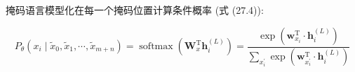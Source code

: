 \documentclass[10pt]{article}
\begin{document}
掩码语言模型化在每一个掩码位置计算条件概率 (式 (27.4)):


\begin{equation*}
P_{\theta}\left(x_{i} \mid \tilde{x}_{0}, \tilde{x}_{1}, \cdots, \tilde{x}_{m+n}\right)=\operatorname{softmax}\left(\boldsymbol{W}_{x}^{\mathrm{T}} \boldsymbol{h}_{i}^{(L)}\right)=\frac{\exp \left(\boldsymbol{w}_{x_{i}}^{\mathrm{T}} \cdot \boldsymbol{h}_{i}^{(L)}\right)}{\sum_{x_{i}^{\prime}} \exp \left(\boldsymbol{w}_{x_{i}^{\prime}}^{\mathrm{T}} \cdot \boldsymbol{h}_{i}^{(L)}\right)} \tag{27.25}
\end{equation*}
\end{document}
